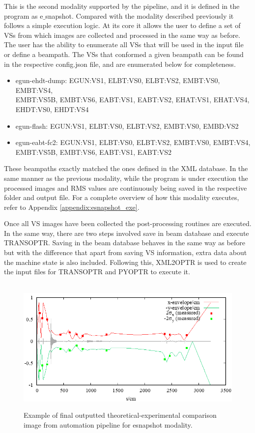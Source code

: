 \documentclass{article}
\begin{document}
This is the second modality supported by the pipeline, and it is defined in the program as e$\_$snapshot. Compared with the modality described previously it follows a simple execution logic. At its core it allows the user to define a set of VSs from which images are collected and processed in the same way as before. The user has the ability to enumerate all VSs that will be used in the input file or define a beampath. The VSs that conformed a given beampath can be found in the respective config.json file, and are enumerated below for completeness.  
\begin{itemize}
    \item egun-ehdt-dump: EGUN:VS1, ELBT:VS0, ELBT:VS2, EMBT:VS0, EMBT:VS4, \\ EMBT:VS5B, EMBT:VS6, EABT:VS1, EABT:VS2, EHAT:VS1, EHAT:VS4, \\ EHDT:VS0, EHDT:VS4
    \item egun-flash: EGUN:VS1, ELBT:VS0, ELBT:VS2, EMBT:VS0, EMBD:VS2
    \item egun-eabt-fc2: EGUN:VS1, ELBT:VS0, ELBT:VS2, EMBT:VS0, EMBT:VS4, \\ EMBT:VS5B, EMBT:VS6, EABT:VS1, EABT:VS2
\end{itemize} 

These beampaths exactly matched the ones defined in the XML database. In the same manner as the previous modality, while the program is under execution the processed images and RMS values are continuously being saved in the respective folder and output file. For a complete overview of how this modality executes, refer to Appendix \ref{appendix:esnapshot_exe}. 

Once all VS images have been collected the post-processing routines are executed. In the same way, there are two steps involved save in beam database and execute TRANSOPTR. Saving in the beam database behaves in the same way as before but with the difference that apart from saving VS information, extra data about the machine state is also included. Following this, XML2OPTR is used to create the input files for TRANSOPTR and PYOPTR to execute it. 

\begin{figure}[!h]  
    \centerline{\ \includegraphics[width=\linewidth]{images/esnapshot_transoptr.png}}
    \caption{Example of final outputted theoretical-experimental comparison image from automation pipeline for esnapshot modality.}
    \label{fig:15}
\end{figure} 
\end{document}
